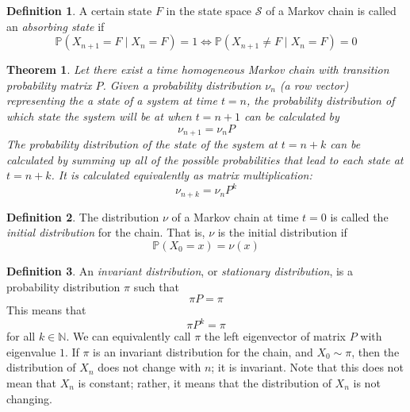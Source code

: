 \documentclass{article}
\newtheorem{theorem}{Theorem}[section]
\theoremstyle{remark}
\theoremstyle{definition}
\newtheorem{definition}{Definition}[section]
\begin{document}
\begin{definition}
A certain state $F$ in the state space $\mathcal{S}$ of a Markov chain is called an \textit{absorbing state} if
\[\mathbb{P}(X_{n+1} = F \; | \; X_n = F) = 1 \iff \mathbb{P}(X_{n+1} \neq F \; | \; X_n = F) = 0\]
\end{definition}

\begin{theorem}
Let there exist a time homogeneous Markov chain with transition probability matrix $P$. Given a probability distribution $\nu_n$ (a row vector) representing the a state of a system at time $t=n$, the probability distribution of which state the system will be at when $t=n+1$ can be calculated by 
\[\nu_{n+1} = \nu_n P\]
The probability distribution of the state of the system at $t=n+k$ can be calculated by summing up all of the possible probabilities that lead to each state at $t=n+k$. It is calculated equivalently as matrix multiplication: 
\[\nu_{n+k} = \nu_n P^k\]
\end{theorem}

\begin{definition}
The distribution $\nu$ of a Markov chain at time $t=0$ is called the \textit{initial distribution} for the chain. That is, $\nu$ is the initial distribution if 
\[\mathbb{P}(X_0 = x) = \nu(x)\]
\end{definition}

\begin{definition}
An \textit{invariant distribution}, or \textit{stationary distribution}, is a probability distribution $\pi$ such that 
\[\pi P = \pi\]
This means that 
\[\pi P^k = \pi\]
for all $k \in \mathbb{N}$. We can equivalently call $\pi$ the left eigenvector of matrix $P$ with eigenvalue $1$. If $\pi$ is an invariant distribution for the chain, and $X_0 \sim \pi$, then the distribution of $X_n$ does not change with $n$; it is invariant. Note that this does not mean that $X_n$ is constant; rather, it means that the distribution of $X_n$ is not changing. 
\end{definition}
\end{document}
